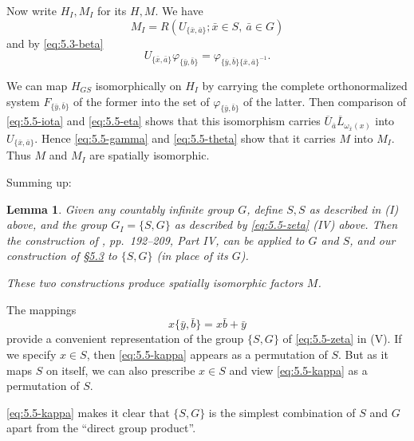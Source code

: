 \documentclass[b5paper,twoside]{article}
\newcommand{\secref}[2]{\hyperref[#1]{\mbox{\S#2}}}
\theoremstyle{mvnplain}
\newtheorem{lemma}{Lemma}[section]
\newcommand{\M}{\mathbf M}
\newcommand{\R}{\mathbf R}
\newcommand{\Hilbert}{\mathfrak H}
\def\M{M}%
\def\R{R}%
\def\Hilbert{H}%
\def\mathfrak#1{#1}%
\begin{document}
Now write \(\Hilbert_I,\M_I\) for its \(\Hilbert,\M\). We have
\begin{equation}\tag{5.5.\(\theta\)}\label{eq:5.5-theta}
 \M_I=\R(U_{\{\bar x,\bar a\}};
 \bar x\in\mathfrak S,\ \bar a\in\mathfrak G)
\end{equation}
and by \eqref{eq:5.3-beta}
\begin{equation}\tag{5.5.\(\iota\)}\label{eq:5.5-iota}
 U_{\{\bar x,\bar a\}}\varphi_{\{\bar y,\bar b\}}
 =\varphi_{\{\bar y,\bar b\}\{\bar x,\bar a\}^{-1}}.
\end{equation}

We can map \(\Hilbert_{\mathfrak G S}\) isomorphically on \(\Hilbert_I\) by
carrying the complete orthonormalized system \(F_{\{\bar y,\bar b\}}\) of the
former into the set of \(\varphi_{\{\bar y,\bar b\}}\) of the latter. Then
comparison of \eqref{eq:5.5-iota} and \eqref{eq:5.5-eta} shows that this
isomorphism carries
\(\overline U_{\bar a}\overline L_{\omega_{\bar x}(x)}\) into
\(U_{\{\bar x,\bar a\}}\). Hence \eqref{eq:5.5-gamma} and
\eqref{eq:5.5-theta} show that it carries \(\M\) into \(\M_I\). Thus \(\M\)
and \(\M_I\) are spatially isomorphic.

Summing up:

\begin{lemma}\label{lem:5.5.1}
Given any countably infinite group \(\mathfrak G\), define
\(S,\mathfrak S\) as described in (I) above, and the group
\(\mathfrak G_I=\{\mathfrak S,\mathfrak G\}\) as described by
\eqref{eq:5.5-zeta} (IV) above. Then the construction of
\cite{ref5}, pp.~192--209, Part IV, can be applied to
\(\mathfrak G\) and \(S\), and our construction of
\secref{sec:5.3}{5.3} to \(\{\mathfrak S,\mathfrak G\}\) (in place of its
\(\mathfrak G\)).

These two constructions produce spatially isomorphic factors \(\M\).
\end{lemma}

The mappings
\begin{equation}\tag{5.5.\(\kappa\)}\label{eq:5.5-kappa}
 x\{\bar y,\bar b\}=x\bar b+\bar y
\end{equation}
provide a convenient representation of the group
\(\{\mathfrak S,\mathfrak G\}\) of \eqref{eq:5.5-zeta} in (V). If we
specify \(x\in S\), then \eqref{eq:5.5-kappa} appears as a permutation of
\(S\). But as it maps \(\mathfrak S\) on itself, we can also prescribe
\(x\in\mathfrak S\) and view \eqref{eq:5.5-kappa} as a permutation of
\(\mathfrak S\).

\eqref{eq:5.5-kappa} makes it clear that
\(\{\mathfrak S,\mathfrak G\}\) is the simplest combination of
\(\mathfrak S\) and \(\mathfrak G\) apart from the ``direct group product''.
\end{document}
